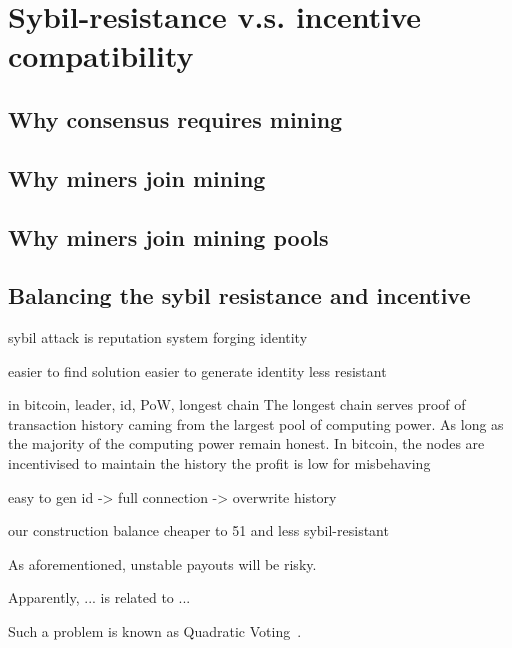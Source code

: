 \section{Sybil-resistance v.s. incentive compatibility}

\subsection{Why consensus requires mining}



\subsection{Why miners join mining}





\subsection{Why miners join mining pools}



\subsection{Balancing the sybil resistance and incentive}



sybil attack is 
reputation system
forging identity

easier to find solution
easier to generate identity
less resistant

in bitcoin, leader, id, PoW, longest chain
The longest chain serves proof of transaction history caming from the largest pool of computing power.
As long as the majority of the computing power remain honest.
In bitcoin, the nodes are incentivised to maintain the history
the profit is low for misbehaving


easy to gen id -> full connection -> overwrite history


our construction
balance
cheaper to 51 and less sybil-resistant


As aforementioned, unstable payouts will be risky.


Apparently, 
... is related to ...

Such a problem is known as Quadratic Voting~\cite{lalley2018quadratic}.
